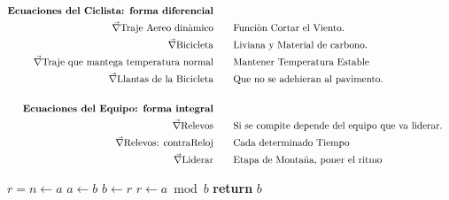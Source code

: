 \documentclass[english]{article}
\begin{document}
\begin{align*}
  \text{\textbf{Ecuaciones del Ciclista: forma diferencial}}\\
  \vec{\nabla}\textup{Traje Aereo dinàmico}& \qquad \textup{Funciòn Cortar el Viento.}\\
  \vec{\nabla}\textup{Bicicleta}& \qquad \textup{Liviana y Material de carbono.}\\
  \vec{\nabla}\textup{Traje que mantega temperatura normal}& \qquad \textup{Mantener Temperatura Estable}\\
  \vec{\nabla}\textup{Llantas de la Bicicleta}& \qquad \textup{Que no se adehieran al pavimento.}\\
  \\
  \text{\textbf{Ecuaciones del Equipo: forma integral}}\\
  \vec{\nabla}\textup{Relevos}& \qquad \textup{Si se compite depende del equipo que va liderar.}\\
  \vec{\nabla}\textup{Relevos: contraReloj}& \qquad \textup{Cada determinado Tiempo}\\
  \vec{\nabla}\textup{Liderar}& \qquad \textup{Etapa de Montaña, poner el ritmo}\\
\end{align*}
\begin{algorithmic}[1]
     
        \State $r= n \gets a$
         
            \State $a \gets b$
            \State $b \gets r$
            \State $r \gets a \bmod b$
        \EndWhile\label{euclidesfinwhile}
        \State \textbf{return} $b$
    \EndProcedure
\end{algorithmic}
\end{document}
